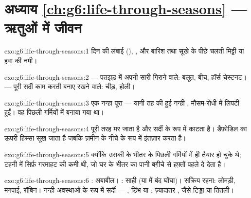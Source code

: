 \section*{अध्याय \ref{ch:g6:life-through-seasons} --- ऋतुओं में जीवन}

\begin{solution}{exo:g6:life-through-seasons:1}
दिन की लंबाई (), , और बारिश तथा सूखे के पीछे चलती मिट्टी या
हवा की नमी।
\end{solution}

\begin{solution}{exo:g6:life-through-seasons:2}
 --- पतझड़ में अपनी सारी  गिराने वाले: बलूत, बीच, हॉर्स
चेस्टनट।  --- पूरी सर्दी काम करती  बनाए रखने वाले: चीड़,
होली।
\end{solution}

\begin{solution}{exo:g6:life-through-seasons:3}
एक नन्हा पूरा  --- यानी तह की हुई नन्ही , मौसम-रोधी 
में लिपटी हुईं। वह पिछली गर्मियों में बनाया गया था।
\end{solution}

\begin{solution}{exo:g6:life-through-seasons:4}
 पूरी तरह मर जाता है और सर्दी  के रूप में काटता है।
डैफ़ोडिल का ऊपरी हिस्सा सूख जाता है जबकि  ज़मीन के नीचे  के
रूप में इंतज़ार करता है।
\end{solution}

\begin{solution}{exo:g6:life-through-seasons:5}
क्योंकि उसकी  के भीतर के  पिछली गर्मियों में ही तैयार हो चुके
थे; टहनी में सिर्फ़ गरमाहट की कमी थी, जो घर के भीतर का पानी बग़ीचे से
हफ़्तों पहले दे देता है।
\end{solution}

\begin{solution}{exo:g6:life-through-seasons:6}
: अबाबील। : साही (या  में बंद घोंघा)। सक्रिय रहना:
लोमड़ी, मगपाई, रॉबिन। नन्ही अवस्थाओं के रूप में सर्दी --- , डिंभ या
: ज़्यादातर , जैसे टिड्डा या तितली।
\end{solution}

